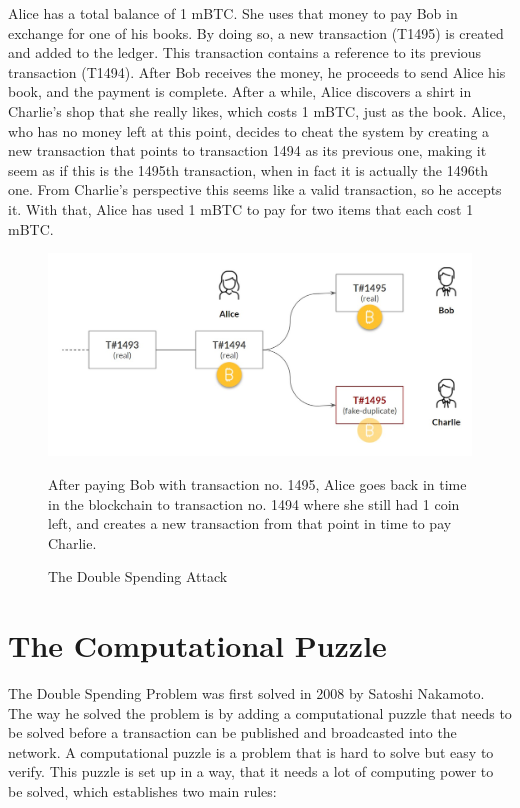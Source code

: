 \documentclass[a4paper, 12pt]{report}
\begin{document}
\par Alice has a total balance of 1 mBTC. She uses that money to pay Bob in exchange for one of his books. By doing so, a new transaction (T1495) is created and added to the ledger. This transaction contains a reference to its previous transaction (T1494). After Bob receives the money, he proceeds to send Alice his book, and the payment is complete. After a while, Alice discovers a shirt in Charlie’s shop that she really likes, which costs 1 mBTC, just as the book. Alice, who has no money left at this point, decides to cheat the system by creating a new transaction that points to transaction 1494 as its previous one, making it seem as if this is the 1495th transaction, when in fact it is actually the 1496th one. From Charlie’s perspective this seems like a valid transaction, so he accepts it. With that, Alice has used 1 mBTC to pay for two items that each cost 1 mBTC.

\begin{figure}[h]
	\includegraphics[width=\textwidth]{03_Double_Spend}
	\caption{The Double Spending Attack}
	\medskip
	\small After paying Bob with transaction no. 1495, Alice goes back in time in the blockchain to transaction no. 1494 where she still had 1 coin left, and creates a new transaction from that point in time to pay Charlie.
	\label{fig:03_Double_Spend}
\end{figure}

\section{The Computational Puzzle}

\par The Double Spending Problem was first solved in 2008 by Satoshi Nakamoto. The way he solved the problem is by adding a computational puzzle that needs to be solved before a transaction can be published and broadcasted into the network. A computational puzzle is a problem that is hard to solve but easy to verify. This puzzle is set up in a way, that it needs a lot of computing power to be solved, which establishes two main rules:
\end{document}
